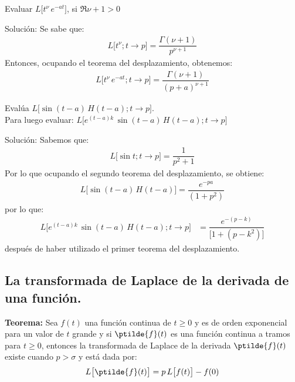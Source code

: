 \begin{ejemplo}
Evaluar $L \big[t^{\nu} \, e^{-a t} \big]$, si $\Re{\nu + 1} > 0$

Solución: Se sabe que:
\begin{align*}
L \big[t^{\nu}; t \to p\big] = \dfrac{\Gamma (\nu + 1)}{p^{\nu+1}}
\end{align*}
Entonces, ocupando el teorema del desplazamiento, obtenemos:
\begin{align*}
L \big[t^{\nu} \, e^{-a t}; t \to p\big] = \dfrac{\Gamma (\nu + 1)}{(p + a)^{\nu+1}}
\end{align*}
\end{ejemplo}
\begin{ejemplo}
Evalúa $L \big[\sin (t - a) \, H(t- a); t \to p\big]$. \\
Para luego evaluar: $L \big[e^{(t-a) k} \, \sin (t - a) \, H(t- a); t \to p\big]$

Solución: Sabemos que:
\begin{align*}
L \big[\sin t; t \to p\big] = \dfrac{1}{p^{2} + 1}
\end{align*}
Por lo que ocupando el segundo teorema del desplazamiento, se obtiene:
\begin{align*}
L \big[\sin (t - a) \, H(t- a)\big] = \dfrac{e^{-p a}}{(1 + p^{2})}
\end{align*}
por lo que:
\begin{align*}
L \big[e^{(t-a) k} \, \sin (t - a) \, H(t- a); t \to p\big] &= \dfrac{e^{-(p - k)}}{\big[1 + (p - k^{2})\big]}
\end{align*}
después de haber utilizado el primer teorema del desplazamiento.
\end{ejemplo}

\subsection{La transformada de Laplace de la derivada de una función.}

\noindent \textbf{Teorema: } Sea $f(t)$ una función continua de $t \geq 0$ y es de orden exponencial para un valor de $t$ grande y si $\ptilde{f}(t)$ es una función continua a tramos para $t \geq 0$, entonces la transformada de Laplace de la derivada $\ptilde{f}(t)$ existe cuando $p > \sigma$ y está dada por:
\begin{align*}
L \big[\ptilde{f}(t)\big] = p \, L \big[f(t)\big] - f(0)
\end{align*}

